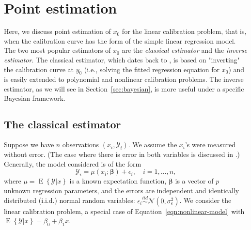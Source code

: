 \documentclass[cmfont,usenames,dvipsnames,leqno]{afit-etd}\usepackage[]{graphicx}\usepackage[]{color}
\newcommand{\mc}[1]{\ensuremath{\mathcal{#1}}}
\newcommand{\E}{\operatorname{E}}
\begin{document}
\section{Point estimation}
\label{sec:point-estimation}

Here, we discuss point estimation of $x_0$ for the linear calibration problem, that is, when the calibration curve has the form of the simple linear regression model. The two most popular estimators of $x_0$ are the \textit{classical estimator} and the \textit{inverse estimator}. The classical estimator, which dates back to \citet{eisenhart_interpretation_1939}, is based on "inverting" the calibration curve at $y_0$ (i.e., solving the fitted regression equation for $x_0$) and is easily extended to polynomial and nonlinear calibration problems. The inverse estimator, as we will see in Section~\ref{sec:bayesian}, is more useful under a specific Bayesian framework.  

\subsection{The classical estimator}
Suppose we have $n$ observations $(x_i, \mc{Y}_i)$. We assume the $x_i$'s were measured without error. (The case where there is error in both variables is discussed in \citet{carroll_effect_1986}.) Generally, the model considered is of the form
\begin{equation}
\label{eqn:nonlinear-model}
  \mc{Y}_i = \mu\left(x_i; \bm{\beta}\right) + \epsilon_i, \quad i = 1, \dotsc, n,
\end{equation}  
where $\mu = \E\left\{\mc{Y} | x\right\}$ is a known expectation function, $\bm{\beta}$ is a vector of $p$ unknown regression parameters, and the errors are independent and identically distributed (i.i.d.) normal random variables: $\epsilon_i \stackrel{iid}{\sim} \mc{N}(0, \sigma_\epsilon^2)$. We consider the linear calibration problem, a special case of Equation~\eqref{eqn:nonlinear-model} with $\E\left\{\mc{Y} | x\right\} = \beta_0 + \beta_1 x$. 
\end{document}
